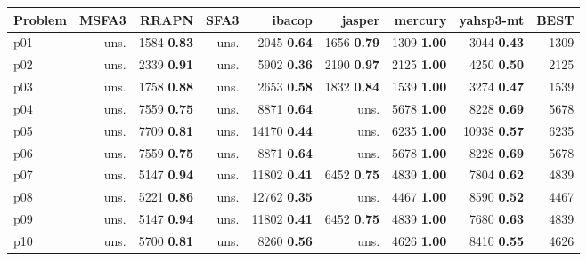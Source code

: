 \begin{tabular}{|l|rrrrrrr|r|}
\hline
\textbf{Problem} & \textbf{MSFA3} & \textbf{RRAPN} & \textbf{SFA3} & \textbf{ibacop} & \textbf{jasper} & \textbf{mercury} & \textbf{yahsp3-mt} & \textbf{BEST}\\
\hline
p01 & uns. & {\footnotesize 1584} \textbf{0.83} & uns. & {\footnotesize 2045} \textbf{0.64} & {\footnotesize 1656} \textbf{0.79} & {\footnotesize 1309} \textbf{1.00} & {\footnotesize 3044} \textbf{0.43} & 1309\\
p02 & uns. & {\footnotesize 2339} \textbf{0.91} & uns. & {\footnotesize 5902} \textbf{0.36} & {\footnotesize 2190} \textbf{0.97} & {\footnotesize 2125} \textbf{1.00} & {\footnotesize 4250} \textbf{0.50} & 2125\\
p03 & uns. & {\footnotesize 1758} \textbf{0.88} & uns. & {\footnotesize 2653} \textbf{0.58} & {\footnotesize 1832} \textbf{0.84} & {\footnotesize 1539} \textbf{1.00} & {\footnotesize 3274} \textbf{0.47} & 1539\\
p04 & uns. & {\footnotesize 7559} \textbf{0.75} & uns. & {\footnotesize 8871} \textbf{0.64} & uns. & {\footnotesize 5678} \textbf{1.00} & {\footnotesize 8228} \textbf{0.69} & 5678\\
p05 & uns. & {\footnotesize 7709} \textbf{0.81} & uns. & {\footnotesize 14170} \textbf{0.44} & uns. & {\footnotesize 6235} \textbf{1.00} & {\footnotesize 10938} \textbf{0.57} & 6235\\
p06 & uns. & {\footnotesize 7559} \textbf{0.75} & uns. & {\footnotesize 8871} \textbf{0.64} & uns. & {\footnotesize 5678} \textbf{1.00} & {\footnotesize 8228} \textbf{0.69} & 5678\\
p07 & uns. & {\footnotesize 5147} \textbf{0.94} & uns. & {\footnotesize 11802} \textbf{0.41} & {\footnotesize 6452} \textbf{0.75} & {\footnotesize 4839} \textbf{1.00} & {\footnotesize 7804} \textbf{0.62} & 4839\\
p08 & uns. & {\footnotesize 5221} \textbf{0.86} & uns. & {\footnotesize 12762} \textbf{0.35} & uns. & {\footnotesize 4467} \textbf{1.00} & {\footnotesize 8590} \textbf{0.52} & 4467\\
p09 & uns. & {\footnotesize 5147} \textbf{0.94} & uns. & {\footnotesize 11802} \textbf{0.41} & {\footnotesize 6452} \textbf{0.75} & {\footnotesize 4839} \textbf{1.00} & {\footnotesize 7680} \textbf{0.63} & 4839\\
p10 & uns. & {\footnotesize 5700} \textbf{0.81} & uns. & {\footnotesize 8260} \textbf{0.56} & uns. & {\footnotesize 4626} \textbf{1.00} & {\footnotesize 8410} \textbf{0.55} & 4626\\

\end{tabular}
